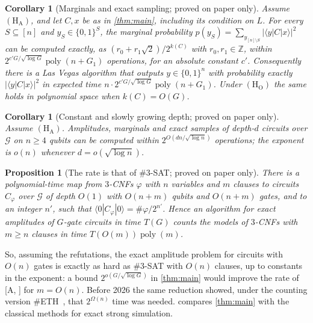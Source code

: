 \documentclass[10pt]{amsart}
\theoremstyle{plain}
\newtheorem{proposition}[theorem]{Proposition}
\newtheorem{corollary}[theorem]{Corollary}
\theoremstyle{definition}
\theoremstyle{remark}
\numberwithin{equation}{section}
\newcommand{\Z}{\mathbb{Z}}
\newcommand{\poly}{\operatorname{poly}}
\newcommand{\cG}{\mathcal{G}}
\newcommand{\amp}[3]{\langle #1|#2|#3\rangle}
\newcommand{\A}[1][]{\textup{[A\if\relax\detokenize{#1}\relax\else, #1\fi]}}
\begin{document}
\begin{corollary}[Marginals and exact sampling; proved on paper only]\label{cor:marginals}
Assume $(\mathrm{H}_{\mathrm{A}})$, and let $C,x$ be as in \cref{thm:main}, including its condition on $L$. For every
$S\subseteq[n]$ and $y_S\in\{0,1\}^S$, the marginal probability
$p(y_S)=\sum_{y_{[n]\setminus S}}|\amp{y}{C}{x}|^2$ can be computed exactly, as
$(r_0+r_1\sqrt2)/2^{k(C)}$ with $r_0,r_1\in\Z$, within $2^{c'G/\sqrt{\log G}}\poly(n+G_1)$
operations, for an absolute constant $c'$. Consequently there is a Las Vegas algorithm that
outputs $y\in\{0,1\}^n$ with probability exactly $|\amp{y}{C}{x}|^2$ in expected time
$n\cdot2^{c'G/\sqrt{\log G}}\poly(n+G_1)$. Under $(\mathrm{H}_{\mathrm{O}})$ the same holds in
polynomial space when $k(C)=O(G)$.
\end{corollary}

\begin{corollary}[Constant and slowly growing depth; proved on paper only]\label{cor:depth}
Assume $(\mathrm{H}_{\mathrm{A}})$. Amplitudes, marginals and exact samples of depth-$d$ circuits
over $\cG$ on $n\ge4$ qubits can be computed within $2^{O(dn/\sqrt{\log n})}$ operations; the
exponent is $o(n)$ whenever $d=o(\sqrt{\log n})$.
\end{corollary}

\begin{proposition}[The rate is that of $\#3$-SAT; proved on paper only]\label{prop:tight}
There is a polynomial-time map from $3$-CNFs $\varphi$ with $n$ variables and $m$ clauses to
circuits $C_\varphi$ over $\cG$ of depth $O(1)$ with $O(n+m)$ qubits and $O(n+m)$ gates, and to
an integer $n'$, such that $\amp{0}{C_\varphi}{0}=\#\varphi/2^{n'}$. Hence an algorithm for exact
amplitudes of $G$-gate circuits in time $T(G)$ counts the models of $3$-CNFs with $m\ge n$
clauses in time $T(O(m))\poly(m)$.
\end{proposition}

So, assuming the refutations, the exact amplitude problem for circuits with $O(n)$ gates is
exactly as hard as $\#3$-SAT with $O(n)$ clauses, up to constants in the exponent: a bound
$2^{o(G/\sqrt{\log G})}$ in \cref{thm:main} would improve the rate of \A{} for $m=O(n)$. Before
2026 the same reduction showed, under the counting version $\#$ETH~\cite{DHMTW14}, that
$2^{\Omega(n)}$ time was needed.  compares \cref{thm:main} with the classical
methods for exact strong simulation.
\end{document}
